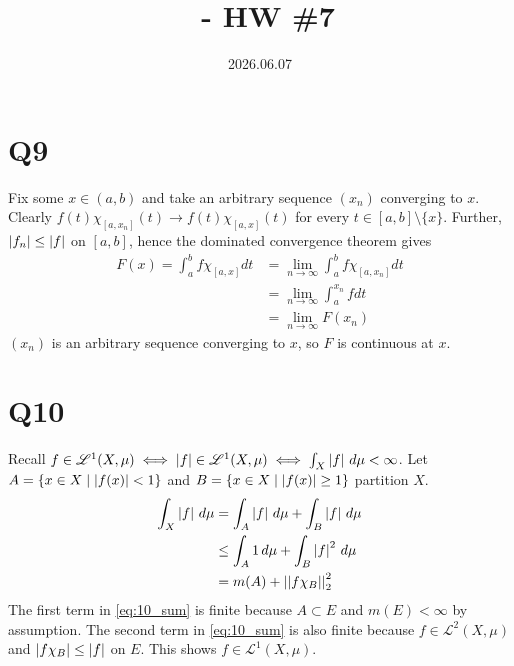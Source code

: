 \documentclass[12pt]{article}
\title{\course\ - HW \#7}
\author{\myname}
\date{2026.06.07}
\begin{document}
\maketitle
\thispagestyle{fancy}


\newcommand{\piInt}{[-\pi, \pi]} 
\newcommand{\Ltwospace}[2]{\mathscr{L}^{2}(#1, #2)}
\newcommand{\Ltwonorm}[1]{\abs{\abs{#1}}_2}
\newcommand{\Lonespace}[2]{\mathscr{L}^{1}(#1, #2)}
\newcommand{\integral}[4]{\int_{#1}^{#2} #4 \, d#3} 

\section*{Q9} 
Fix some $x \in (a, b)$ and take an arbitrary sequence $(x_n)$ converging to $x$. 
Clearly $f(t) \chi_{[a, x_n]}(t) \rightarrow f(t)\chi_{[a, x]}(t)$ for every $t \in [a, b] \setminus \{x\}$. 
Further, $\left|f_n\right| \leq \left|f\right|$ on $[a, b]$, hence the dominated convergence theorem gives 
\begin{align*}
  F(x) = \int_{a}^{b} f\chi_{[a, x]}dt 
  & = \lim_{n \rightarrow \infty} \int_{a}^{b} f \chi_{[a, x_n]} dt \\  
  & = \lim_{n \rightarrow \infty} \int_{a}^{x_n} f dt \\ 					
  & = \lim_{n \rightarrow \infty} F(x_n)
\end{align*}
$(x_n)$ is an arbitrary sequence converging to $x$, so $F$ is continuous at $x$. 

\section*{Q10} 
Recall $f \in \Lonespace{X}{\mu} \iff \abs{f} \in \Lonespace{X}{\mu} \iff \int_{X} \abs{f} \, d\mu < \infty$. 
Let $A = \{x \in X \mid \left|f(x)\right| < 1\}$ and $B = \{x \in X \mid \left|f(x)\right| \geq 1\}$ partition $X$. 
\begin{align}
  \integral{X}{}{\mu}{\abs{f}} & = \integral{A}{}{\mu}{\abs{f}} + \integral{B}{}{\mu}{\abs{f}} \nonumber \\ 
							   & \leq \integral{A}{}{\mu}{1} + \integral{B}{}{\mu}{\abs{f}^2} \nonumber \\
							   & = m(A) + \Ltwonorm{f\chi_{B}}^2 \label{eq:10_sum}
\end{align}
The first term in \eqref{eq:10_sum} is finite because $A \subset E$ and $m(E) < \infty$ by assumption. 
The second term in \eqref{eq:10_sum} is also finite because $f \in \Ltwospace{X}{\mu}$ and $\left|f\chi_B\right| \leq \left|f\right|$ on $E$. 
This shows $f \in \Lonespace{X}{\mu}$. 
\end{document}
